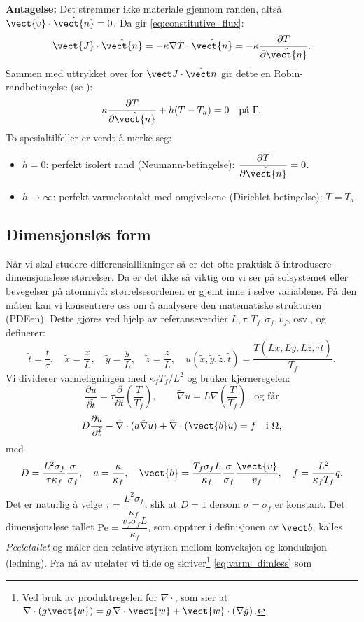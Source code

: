 \textbf{Antagelse:} Det strømmer ikke materiale gjennom randen, altså \( \vect{v} \cdot \hat{\vect{n}} = 0 \). Da gir \eqref{eq:constitutive_flux}:
\[
\vect{J} \cdot \hat{\vect{n}} = -\kappa \nabla T \cdot \hat{\vect{n}} = -\kappa \frac{\partial T}{\partial \hat{\vect{n}}}.
\]
Sammen med uttrykket over for $\vect J\cdot\hat{\vect n}$ gir dette en Robin-randbetingelse (se ):
\begin{equation} \label{varme:rand}
\kappa \frac{\partial T}{\partial \hat{\vect{n}}} + h(T - T_a) = 0 \quad \text{på } \Gamma.
\end{equation}
To spesialtilfeller er verdt å merke seg:
\begin{itemize}
\item \( h = 0 \): perfekt isolert rand (Neumann-betingelse): \( \dfrac{\partial T}{\partial \hat{\vect{n}}} = 0 \).
\item \( h \to \infty \): perfekt varmekontakt med omgivelsene (Dirichlet-betingelse): \( T = T_a \).
\end{itemize}

\subsection*{Dimensjonsløs form}
Når vi skal studere differensiallikninger så er det ofte praktisk å introdusere dimensjonsløse størrelser. Da er det ikke så viktig om vi ser på solsystemet eller bevegelser på atomnivå: størrelsesordenen er gjemt inne i selve variablene. På den måten kan vi konsentrere oss om å analysere den matematiske strukturen (PDEen). Dette gjøres ved hjelp av referanseverdier \( L, \tau, T_f, \sigma_f, v_f \), osv., og definerer:
\[
\tilde{t} = \frac{t}{\tau}, \quad \tilde{x} = \frac{x}{L},\quad \tilde{y} = \frac{y}{L},\quad \tilde{z} = \frac{z}{L}, \quad u(\tilde{x},\tilde{y},\tilde{z}, \tilde{t}) = \frac{T(L \tilde{x},L \tilde{y},L \tilde{z}, \tau \tilde{t})}{T_f}.
\]
Vi dividerer varmeligningen med \( \kappa_f T_f / L^2 \) og bruker kjerneregelen:
\[\frac{\partial u}{\partial \tilde{t}} = \tau \frac{\partial}{\partial t}\left(\frac{T}{T_f}\right), \qquad \tilde{\nabla} u = L\nabla \left(\frac{T}{T_f}\right), \text{ og får}\]
\begin{equation}\label{eq:varm_dimless}
D \frac{\partial u}{\partial \tilde{t}} - \tilde{\nabla} \cdot (a \tilde{\nabla} u) + \tilde{\nabla} \cdot (\vect{b}u) = f \quad \text{i } \Omega,
\end{equation}
med
\[
D = \frac{L^2 \sigma_f}{\tau \kappa_f}\frac{\sigma}{\sigma_f}, \quad a = \frac{\kappa}{\kappa_f}, \quad \vect{b} = \frac{T_f \sigma_f L}{\kappa_f}\frac{\sigma}{\sigma_f} \frac{\vect{v}}{v_f}, \quad f=\frac{L^2}{\kappa_f T_f}q.
\]
Det er naturlig å velge \( \tau = \dfrac{L^2 \sigma_f}{\kappa_f} \), slik at \( D = 1 \) dersom \( \sigma = \sigma_f \) er konstant. Det dimensjonsløse tallet \( \mathrm{Pe} = \dfrac{v_f \sigma_f L}{\kappa_f} \), som opptrer i definisjonen av \( \vect b \), kalles \emph{Pecletallet} og måler den relative styrken mellom konveksjon og konduksjon (ledning). Fra nå av utelater vi tilde og skriver\footnote{Ved bruk av produktregelen for $\nabla\cdot$, som sier at $\nabla\cdot(g\vect{w})=g\,\nabla\cdot\vect{w} +\vect{w} \cdot (\nabla g)$.} \eqref{eq:varm_dimless} som

